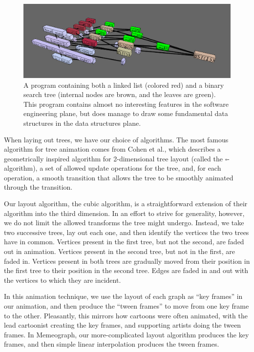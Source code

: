 \documentclass[11pt]{article}
\begin{document}
\begin{figure}
\begin{center}
\includegraphics[width=5in]{figures/basic.png}
\end{center}
\caption{A program containing both a linked list (colored red) and a binary
search tree (internal nodes are brown, and the leaves are green).  This program
contains almost no interesting features in the software engineering plane, but
does manage to draw some fundamental data structures in the data structures
plane.}
\label{fig:basic}
\end{figure}

When laying out trees, we have our choice of algorithms.  The most famous
algorithm for tree animation comes from Cohen et al.\cite{tamassia}, which
describes a geometrically inspired algorithm for 2-dimensional tree layout
(called the $\square$-algorithm), a set of allowed update operations for the
tree, and, for each operation, a smooth transition that allows the tree to be
smoothly animated through the transition.

Our layout algorithm, the cubic algorithm, is a straightforward extension of
their algorithm into the third dimension.  In an effort to strive for
generality, however, we do not limit the allowed transforms the tree might
undergo.  Instead, we take two successive trees, lay out each one, and then
identify the vertices the two trees have in common.  Vertices present in the
first tree, but not the second, are faded out in animation.  Vertices present
in the second tree, but not in the first, are faded in.  Vertices present in
both trees are gradually moved from their position in the first tree to their
position in the second tree.  Edges are faded in and out with the vertices to
which they are incident.

In this animation technique, we use the layout of each graph as ``key frames''
in our animation, and then produce the ``tween frames'' to move from one key
frame to the other.  Pleasantly, this mirrors how cartoons were often animated,
with the lead cartoonist creating the key frames, and supporting artists doing
the tween frames.  In Memeograph, our more-complicated layout algorithm
produces the key frames, and then simple linear interpolation produces the
tween frames.
\end{document}
